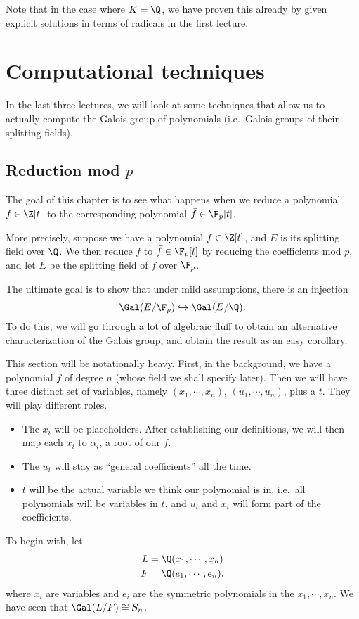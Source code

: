 \documentclass[a4paper]{article}
\begin{document}
Note that in the case where $K = \Q$, we have proven this already by given explicit solutions in terms of radicals in the first lecture.

\section{Computational techniques}
In the last three lectures, we will look at some techniques that allow us to actually compute the Galois group of polynomials (i.e.\ Galois groups of their splitting fields). 

\subsection{Reduction mod \texorpdfstring{$p$}{p}}
The goal of this chapter is to see what happens when we reduce a polynomial $f \in \Z[t]$ to the corresponding polynomial $\bar{f} \in \F_p[t]$.

More precisely, suppose we have a polynomial $f \in \Z[t]$, and $E$ is its splitting field over $\Q$. We then reduce $f$ to $\bar{f} \in \F_p[t]$ by reducing the coefficients mod $p$, and let $\bar{E}$ be the splitting field of $\bar{f}$ over $\F_p$.

The ultimate goal is to show that under mild assumptions, there is an injection
\[
  \Gal(\overline{E}/\F_p) \hookrightarrow \Gal(E/\Q).
\]
To do this, we will go through a lot of algebraic fluff to obtain an alternative characterization of the Galois group, and obtain the result as an easy corollary.

This section will be notationally heavy. First, in the background, we have a polynomial $f$ of degree $n$ (whose field we shall specify later). Then we will have three distinct set of variables, namely $(x_1, \cdots, x_n)$, $(u_1, \cdots, u_n)$, plus a $t$. They will play different roles.
\begin{itemize}
  \item The $x_i$ will be placeholders. After establishing our definitions, we will then map each $x_i$ to $\alpha_i$, a root of our $f$.
  \item The $u_i$ will stay as ``general coefficients'' all the time.
  \item $t$ will be the actual variable we think our polynomial is in, i.e.\ all polynomials will be variables in $t$, and $u_i$ and $x_i$ will form part of the coefficients.
\end{itemize}

To begin with, let
\begin{align*}
  L &= \Q(x_1, \cdots, x_n)\\
  F &= \Q(e_1, \cdots, e_n).
\end{align*}
where $x_i$ are variables and $e_i$ are the symmetric polynomials in the $x_1, \cdots, x_n$. We have seen that $\Gal(L/F) \cong S_n$.
\end{document}
